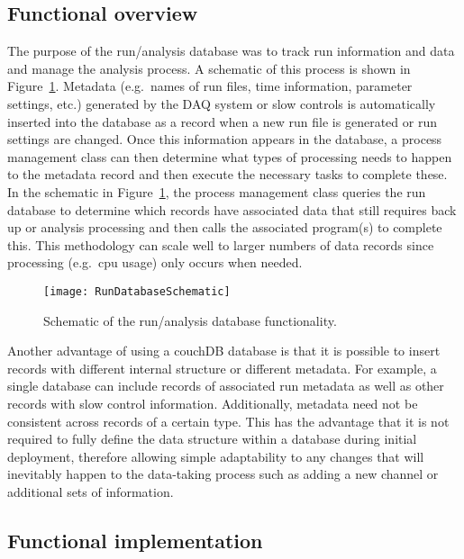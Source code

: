 		\subsection{Functional overview}
		
	The purpose of the run/analysis database was to track run information and data and manage the analysis process.  A schematic of this process is shown in Figure~\ref{fig:RunDBSchem}.  Metadata (e.g.~names of run files, time information, parameter settings, etc.) generated by the DAQ system or slow controls is automatically inserted into the database as a record when a new run file is generated or run settings are changed.  Once this information appears in the database, a process management class can then determine what types of processing needs to happen to the metadata record and then execute the necessary tasks to complete these.  In the schematic in Figure~\ref{fig:RunDBSchem}, the process management class queries the run database to determine which records have associated data that still requires back up or analysis processing and then calls the associated program(s) to complete this.  This methodology can scale well to larger numbers of data records since processing (e.g.~cpu usage) only occurs when needed.  

			\begin{figure}
				\centering
				\texttt{[image: RunDatabaseSchematic]}
				\caption[Schematic of the run/analysis database functionality.]
				{Schematic of the run/analysis database functionality.}
				\label{fig:RunDBSchem}
			\end{figure}	

	Another advantage of using a couchDB database is that it is possible to insert records with different internal structure or different
metadata.  For example, a single database can include records of associated run metadata as well as other records with slow control information.  Additionally, metadata need not be consistent across records of a certain type.  This has the advantage that it is not required to fully define the data structure within a database during initial deployment, therefore allowing simple adaptability to any changes that will inevitably happen to the data-taking process such as adding a new channel or additional sets of information.  

		\subsection{Functional implementation}
	
